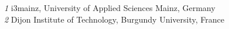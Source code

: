 \textit{1}  i3mainz, University of Applied Sciences Mainz, Germany    \\                                                                    
\setlength\parindent{24pt}\textit{2}  Dijon Institute of Technology, Burgundy University, France
